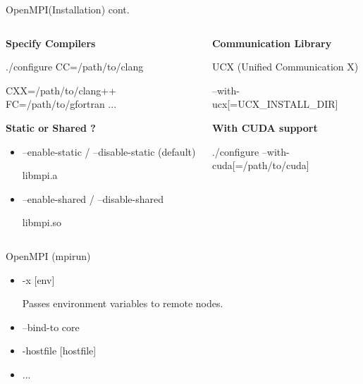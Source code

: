 \begin{frame}[fragile]{OpenMPI(Installation) cont.}
\begin{columns}
    \begin{column}{.5 \textwidth}

    \textbf{\small Specify Compilers}
    
    {\scriptsize ./configure CC=/path/to/clang \\}

    {\scriptsize CXX=/path/to/clang++ FC=/path/to/gfortran ...}

    \vspace{1cm}
      \textbf{\small Static or Shared ?}
    {\scriptsize \begin{itemize}
        \item --enable-static / --disable-static (default)

        libmpi.a

        \item --enable-shared / --disable-shared

        libmpi.so
    \end{itemize}}
    \end{column}

    
    
    \begin{column}{.5 \textwidth}
        \textbf{\small Communication Library}
        
        UCX (Unified Communication X)

        {\scriptsize --with-ucx[=UCX\_INSTALL\_DIR]}
        
        \vspace{1cm}
        
        \textbf{\small With CUDA support}

        {\scriptsize ./configure --with-cuda[=/path/to/cuda]}
    \end{column}    
\end{columns}
\end{frame}

\begin{frame}[fragile]{OpenMPI (mpirun)}

\begin{itemize}
    \item -x [env]

    Passes environment variables to remote nodes.

    \item --bind-to core

    \item -hostfile [hostfile]

    \item ...
\end{itemize}
\end{frame}


